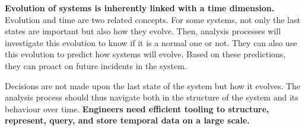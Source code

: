 \textbf{Evolution of systems is inherently linked with a time dimension.}
Evolution and time are two related concepts.
For some systems, not only the last states are important but also how they evolve.
Then, analysis processes will investigate this evolution to know if it is a normal one or not.
They can also use this evolution to predict how systems will evolve.
Based on these predictions, they can proact on future incidents in the system.

Decisions are not made upon the last state of the system but how it evolves.
The analysis process should thus navigate both in the structure of the system and its behaviour over time.
\textbf{Engineers need efficient tooling to structure, represent, query, and store temporal data on a large scale.}





